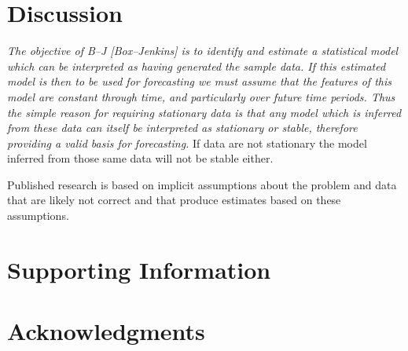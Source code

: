 \documentclass[10pt,letterpaper]{article}
\begin{document}


\section*{Discussion}
\textit{The objective of B–J [Box–Jenkins] is to identify and estimate a statistical model which can be interpreted as having generated the sample data. If this estimated model is then to be used for forecasting we must assume that the features of this model are constant through time, and particularly over future time periods. Thus the simple reason for requiring stationary data is that any model which is inferred from these data can itself be interpreted as stationary or stable, therefore providing a valid basis for forecasting.} 
If data are not stationary the model inferred from those same data will not be stable either.


Published research is based on implicit assumptions about the problem and data that are likely not correct and that produce estimates based on these assumptions.

\section*{Supporting Information}


\section*{Acknowledgments}

\nolinenumbers

%
%
% 
\end{document}
